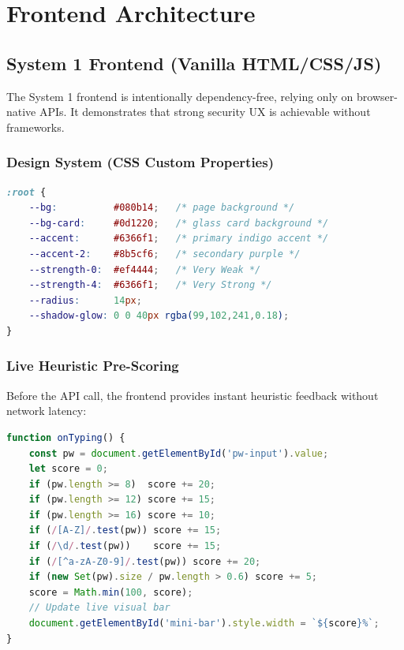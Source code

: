 \documentclass[12pt,a4paper]{article}
\begin{document}
\section{Frontend Architecture}

\subsection{System 1 Frontend (Vanilla HTML/CSS/JS)}

The System 1 frontend is intentionally dependency-free, relying only on
browser-native APIs. It demonstrates that strong security UX is achievable
without frameworks.

\subsubsection{Design System (CSS Custom Properties)}

\begin{lstlisting}[language=CSS, caption={CSS Design Token System}]
:root {
    --bg:          #080b14;   /* page background */
    --bg-card:     #0d1220;   /* glass card background */
    --accent:      #6366f1;   /* primary indigo accent */
    --accent-2:    #8b5cf6;   /* secondary purple */
    --strength-0:  #ef4444;   /* Very Weak */
    --strength-4:  #6366f1;   /* Very Strong */
    --radius:      14px;
    --shadow-glow: 0 0 40px rgba(99,102,241,0.18);
}
\end{lstlisting}

\subsubsection{Live Heuristic Pre-Scoring}

Before the API call, the frontend provides instant heuristic feedback
without network latency:

\begin{lstlisting}[language=JavaScript, caption={Client-Side Live Heuristic Score}]
function onTyping() {
    const pw = document.getElementById('pw-input').value;
    let score = 0;
    if (pw.length >= 8)  score += 20;
    if (pw.length >= 12) score += 15;
    if (pw.length >= 16) score += 10;
    if (/[A-Z]/.test(pw)) score += 15;
    if (/\d/.test(pw))    score += 15;
    if (/[^a-zA-Z0-9]/.test(pw)) score += 20;
    if (new Set(pw).size / pw.length > 0.6) score += 5;
    score = Math.min(100, score);
    // Update live visual bar
    document.getElementById('mini-bar').style.width = `${score}%`;
}
\end{lstlisting}
\end{document}
